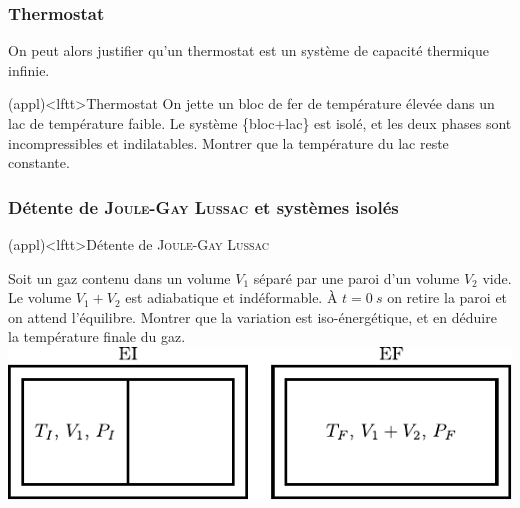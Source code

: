 \documentclass[../../main/main.tex]{subfiles}
\begin{document}
\subsubsection{Thermostat}
On peut alors justifier qu'un thermostat est un système de capacité thermique
infinie.
\begin{tcb}[sidebyside](appl)<lftt>{Thermostat}
	On jette un bloc de fer de température élevée dans un lac de température
	faible. Le système \{bloc+lac\} est isolé, et les deux phases sont
	incompressibles et indilatables. Montrer que la température du lac reste
	constante.
	\tcblower
\end{tcb}

\subsubsection{Détente de \textsc{Joule-Gay Lussac} et systèmes isolés}

\begin{tcb*}(appl)<lftt>{Détente de \textsc{Joule-Gay Lussac}}
	\begin{isd}
		Soit un gaz contenu dans un volume $V_1$ séparé par une paroi d’un volume
		$V_2$ vide. Le volume $V_1 + V_2$ est adiabatique et indéformable. À $t =
			\SI{0}{s}$ on retire la paroi et on attend l’équilibre. Montrer que la
		variation est iso-énergétique, et en déduire la température finale du gaz.
		\tcblower
		\includegraphics[width=\linewidth]{jgl}
	\end{isd}
	\tcblower
	\vspace{-15pt}
\end{tcb*}
\end{document}
